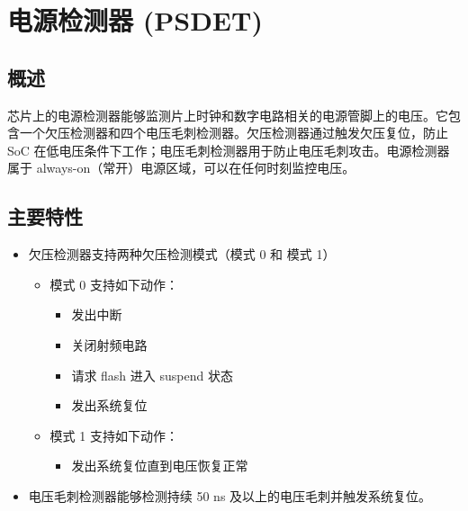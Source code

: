 \documentclass[main\_\_CN.tex]{subfiles}
\begin{document}

\ifglobal
\else
    \listoftodos
    {\let\clearpage\relax \listofdonetodos}
    \tableofcontents
\fi




\hypertarget{psdet}{}
\chapter{电源检测器 (PSDET)}
\label{mod:psdet}

\section{概述}
\chipname{} 芯片上的电源检测器能够监测片上时钟和数字电路相关的电源管脚上的电压。它包含一个欠压检测器和四个电压毛刺检测器。欠压检测器通过触发欠压复位，防止 SoC 在低电压条件下工作；电压毛刺检测器用于防止电压毛刺攻击。电源检测器属于 always-on（常开）电源区域，可以在任何时刻监控电压。


\section{主要特性}
\label{sec:psdet-features}

\begin{itemize}
    \item 欠压检测器支持两种欠压检测模式（模式 0 和 模式 1）
    \begin{itemize}
    \item 模式 0 支持如下动作：
        \begin{itemize}
        \item 发出中断
        \item 关闭射频电路
        \item 请求 flash 进入 suspend 状态
        \item 发出系统复位
        \end{itemize}
    \item 模式 1 支持如下动作：
        \begin{itemize}
        \item 发出系统复位直到电压恢复正常
        \end{itemize}
    \end{itemize}
    \item 电压毛刺检测器能够检测持续 50 ns 及以上的电压毛刺并触发系统复位。
\end{itemize}
\end{document}
